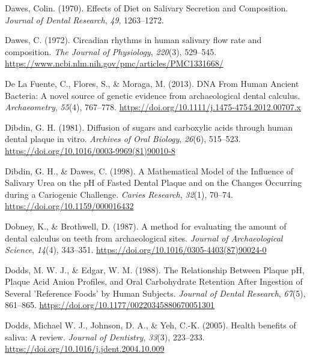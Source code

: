 \documentclass[
  letterpaper,
]{book}
\newlength{\cslhangindent}
\newlength{\cslentryspacingunit} %
\newenvironment{CSLReferences}[2] %
 {%
  \setlength{\parindent}{0pt}
  \ifodd #1
  \let\oldpar\par
  \def\par{\hangindent=\cslhangindent\oldpar}
  \fi
  \setlength{\parskip}{#2\cslentryspacingunit}
 }%
 {}
\begin{document}
\begin{CSLReferences}{1}{0}
\leavevmode{}%
Dawes, Colin. (1970). Effects of {Diet} on {Salivary Secretion} and
{Composition}. \emph{Journal of Dental Research}, \emph{49}, 1263--1272.

\leavevmode{}%
Dawes, C. (1972). Circadian rhythms in human salivary flow rate and
composition. \emph{The Journal of Physiology}, \emph{220}(3), 529--545.
\url{https://www.ncbi.nlm.nih.gov/pmc/articles/PMC1331668/}

\leavevmode{}%
De La Fuente, C., Flores, S., \& Moraga, M. (2013). {DNA From Human
Ancient Bacteria}: {A} novel source of genetic evidence from
archaeological dental calculus. \emph{Archaeometry}, \emph{55}(4),
767--778. \url{https://doi.org/10.1111/j.1475-4754.2012.00707.x}

\leavevmode{}%
Dibdin, G. H. (1981). Diffusion of sugars and carboxylic acids through
human dental plaque in vitro. \emph{Archives of Oral Biology},
\emph{26}(6), 515--523.
\url{https://doi.org/10.1016/0003-9969(81)90010-8}

\leavevmode{}%
Dibdin, G. H., \& Dawes, C. (1998). A {Mathematical Model} of the
{Influence} of {Salivary Urea} on the {pH} of {Fasted Dental Plaque} and
on the {Changes Occurring} during a {Cariogenic Challenge}. \emph{Caries
Research}, \emph{32}(1), 70--74. \url{https://doi.org/10.1159/000016432}

\leavevmode{}%
Dobney, K., \& Brothwell, D. (1987). A method for evaluating the amount
of dental calculus on teeth from archaeological sites. \emph{Journal of
Archaeological Science}, \emph{14}(4), 343--351.
\url{https://doi.org/10.1016/0305-4403(87)90024-0}

\leavevmode{}%
Dodds, M. W. J., \& Edgar, W. M. (1988). The {Relationship Between
Plaque pH}, {Plaque Acid Anion Profiles}, and {Oral Carbohydrate
Retention After Ingestion} of {Several} '{Reference Foods}' by {Human
Subjects}. \emph{Journal of Dental Research}, \emph{67}(5), 861--865.
\url{https://doi.org/10.1177/00220345880670051301}

\leavevmode{}%
Dodds, Michael W. J., Johnson, D. A., \& Yeh, C.-K. (2005). Health
benefits of saliva: A review. \emph{Journal of Dentistry}, \emph{33}(3),
223--233. \url{https://doi.org/10.1016/j.jdent.2004.10.009}


\end{CSLReferences}
\end{document}
